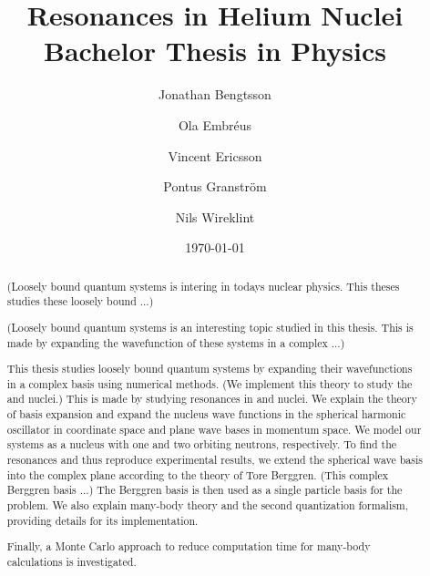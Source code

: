 \documentclass[12pt,a4paper]{report}
\begin{document}
  

\listoftodos


\title{Resonances in Helium Nuclei\\ 
\Large Bachelor Thesis in Physics}
\author{Jonathan Bengtsson \and Ola Embréus \and Vincent Ericsson \and Pontus Granström \and Nils Wireklint}
\date{\today}
\maketitle


\begin{abstract}
(Loosely bound quantum systems is intering in todays nuclear physics. This theses studies these loosely bound ...)

(Loosely bound quantum systems is an interesting topic studied in this thesis. This is made by expanding the wavefunction of these systems in a complex ...)

This thesis studies loosely bound quantum systems by expanding their wavefunctions in a complex basis using numerical methods. 
(We implement this theory to study the  and  nuclei.)
This is made by studying
resonances in  and  nuclei. We explain the theory of basis
expansion and expand the  nucleus wave functions in the spherical harmonic oscillator in coordinate space
and plane wave bases in momentum space. We model our systems as a  nucleus with one and two orbiting neutrons, respectively.
To find the resonances and thus reproduce experimental results, we extend the spherical wave basis into the complex plane according to the 
theory of Tore Berggren. 
(This complex Berggren basis ...) The Berggren basis is then used as a single particle
basis for the  problem. 
We also explain many-body theory and the second quantization formalism, providing details for its implementation.

Finally, a Monte Carlo approach to reduce computation time for many-body calculations is investigated.

\end{abstract}
\end{document}
